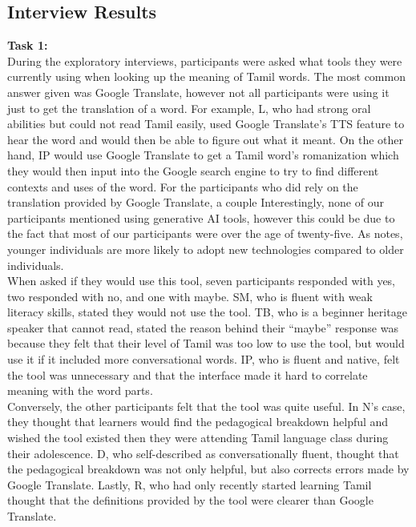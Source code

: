 \documentclass[11pt]{article}
\begin{document}
\subsection{Interview Results}
\textbf{Task 1:}\\
During the exploratory interviews, participants were asked what tools they were currently using when looking 
up the meaning of Tamil words. The most common answer given was Google Translate, 
however not all participants were using it just to get the translation of a word. 
For example, L, who had strong oral abilities but could not read Tamil easily, 
used Google Translate’s TTS feature to hear the word and would then be able to figure out what it meant. 
On the other hand, IP would use Google Translate to get a Tamil word’s romanization which they would 
then input into the Google search engine to try to find different contexts and uses of the word. 
For the participants who did rely on the translation provided by Google Translate, 
a couple Interestingly, none of our participants mentioned using generative AI tools,
however this could be due to the fact that most of our participants were over the age of twenty-five. 
As \citet{MAGOTRA201681} notes, younger individuals are more likely to 
adopt new technologies compared to older individuals.
\\
When asked if they would use this tool, seven participants responded with yes, two responded with no, and one with maybe.  
SM, who is fluent with weak literacy skills, stated they would not use the tool. 
TB, who is a beginner heritage speaker that cannot read, stated the reason behind 
their “maybe” response was because they felt that their level of Tamil was 
too low to use the tool, but would use it if it included more conversational words. 
IP, who is fluent and native, felt the tool was unnecessary and that the 
interface made it hard to correlate meaning with the word parts.
\\
Conversely, the other participants felt that the tool was quite useful. 
In N’s case, they thought that learners would find the pedagogical 
breakdown helpful and wished the tool existed then they were attending 
Tamil language class during their adolescence. D, who self-described as 
conversationally fluent, thought that the pedagogical breakdown was 
not only helpful, but also corrects errors made by Google Translate. 
Lastly, R, who had only recently started learning Tamil thought that 
the definitions provided by the tool were clearer than Google Translate.
\end{document}
